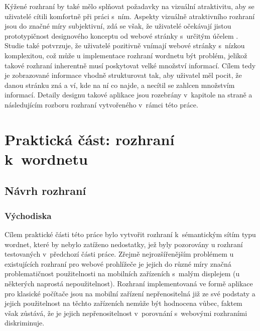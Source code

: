 \documentclass[a4paper,11pt,openany,twoside]{book}
\newcommand{\itNameRef}[1]{\textit{\nameref{#1}}}
\begin{document}
			Kýžené rozhraní by také mělo splňovat požadavky na vizuální atraktivitu, aby se uživatelé cítili komfortně při práci s~ním. Aspekty vizuálně atraktivního rozhraní jsou do značné míry subjektivní, zdá se však, že uživatelé očekávají jistou prototypičnost designového konceptu od webové stránky s~určitým účelem \parencite{walker2013simple, tuch2012role}. Studie \parencite{tuch2012role} také potvrzuje, že uživatelé pozitivně vnímají webové stránky s~nízkou komplexitou, což může u implementace rozhraní wordnetu být problém, jelikož takové rozhraní inherentně musí poskytovat velké množství informací. Cílem tedy je zobrazované informace vhodně strukturovat tak, aby uživatel měl pocit, že danou stránku zná a ví, kde na ní co najde, a necítil se zahlcen množstvím informací. Detaily designu takové aplikace jsou rozebrány v~kapitole \itNameRef{cha:navrh} na straně \pageref{cha:navrh} a následujícím rozboru rozhraní vytvořeného v~rámci této práce.

	\part{Praktická část: rozhraní k~wordnetu}
	\label{part:drei}

		\chapter{Návrh rozhraní}
		\label{cha:navrh}


			\section{Východiska}

				Cílem praktické části této práce bylo vytvořit rozhraní k~sémantickým sítím typu wordnet, které by nebylo zatíženo nedostatky, jež byly pozorovány u rozhraní testovaných v~předchozí části práce. Zřejmě nejrozšířenějším problémem u existujících rozhraní pro webové prohlížeče je jejich do různé míry značná problematičnost použitelnosti na mobilních zařízeních s~malým displejem (u některých naprostá nepoužitelnost). Rozhraní implementovaná ve formě aplikace pro klasické počítače jsou na mobilní zařízení nepřenositelná již ze své podstaty a jejich použitelnost na těchto zařízeních nemůže být hodnocena vůbec, faktem však zůstává, že je jejich nepřenositelnost v~porovnání s~webovými rozhraními diskriminuje. 
\end{document}
